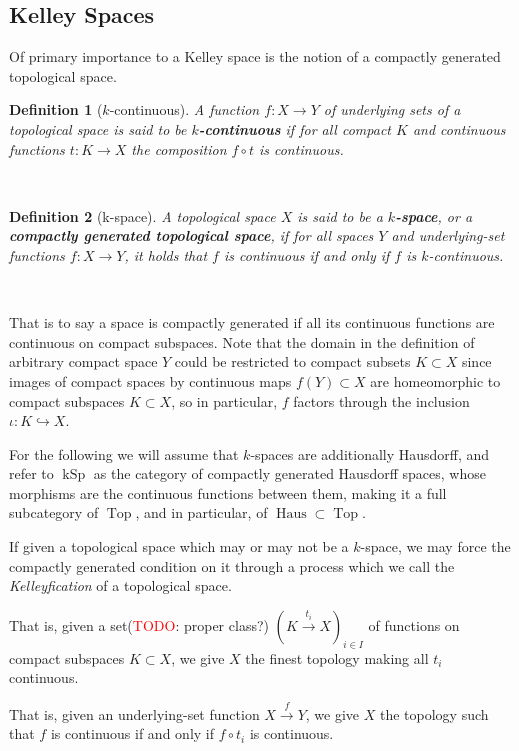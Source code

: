 \documentclass[12pt,a4paper]{article}
\newtheorem{definition}{Definition}[section] %
\DeclareMathOperator{\Top}{Top}
\DeclareMathOperator{\kSp}{kSp}
\DeclareMathOperator{\Haus}{Haus}
\begin{document}
\subsection{Kelley Spaces}
Of primary importance to a Kelley space is the notion of a compactly generated topological space.
\\
\begin{definition}[$k$-continuous]
	A function $f: X \to Y$ of underlying sets of a topological space is said to be \textbf{$k$-continuous} if for all compact $K$ and continuous functions $t: K \to X$ the composition $f \circ t$ is continuous. 
\end{definition}
\
\begin{definition}[k-space]
A topological space $X$ is said to be a \textbf{$k$-space}, or a \textbf{compactly generated topological space}, if for all spaces $Y$ and underlying-set functions $f: X \to Y$, it holds that $f$ is continuous if and only if $f$ is $k$-continuous.	
\end{definition}
\



That is to say a space is compactly generated if all its continuous functions are continuous on compact subspaces. Note that the domain in the definition of arbitrary compact space $Y$ could be restricted to compact subsets $K \subset X$ since images of compact spaces by continuous maps $f(Y) \subset X$ are homeomorphic to compact subspaces  $K \subset X$, so in particular, $f$ factors through the inclusion $\iota: K \hookrightarrow X$. 

For the following we will assume that $k$-spaces are additionally Hausdorff, and refer to ${\kSp}$ as the category of compactly generated Hausdorff spaces, whose morphisms are the continuous functions between them, making it a full subcategory of $\Top$, and in particular, of $\Haus \subset \Top$. 

If given a topological space which may or may not be a $k$-space, we may force the compactly generated condition on it through a process which we call the \emph{Kelleyfication} of a topological space.

That is, given a set(\textcolor{red}{TODO}: proper class?) $(K \stackrel{t_i}{\to} X)_{i \in I}$ of functions on compact subspaces $K\subset X$, we give $X$ the finest topology making all $t_i$ continuous. 

That is, given an underlying-set function $X \stackrel{f}{\to} Y$, we give $X$ the topology such that $f$ is continuous if and only if $f \circ t_i$ is continuous. 
\end{document}
